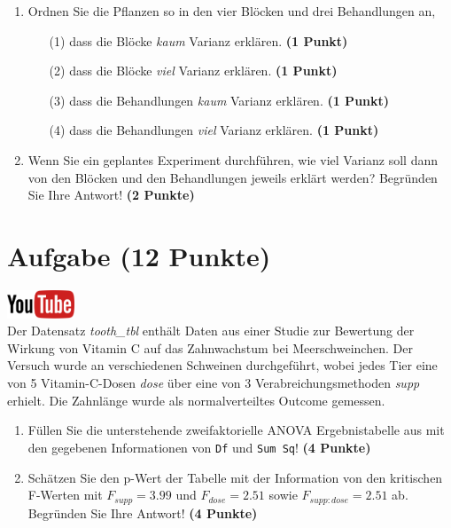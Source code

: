 \documentclass[a4paper, 10pt]{scrartcl}\usepackage[]{graphicx}\usepackage[]{xcolor}
\begin{document}
\begin{enumerate}
\item Ordnen Sie die Pflanzen so in den vier Bl{\"o}cken und drei Behandlungen an,
  \begin{enumerate}
  \item[(1)] dass die Bl{\"o}cke \textit{kaum} Varianz erkl{\"a}ren. \textbf{(1 Punkt)}
  \item[(2)] dass die Bl{\"o}cke \textit{viel} Varianz erkl{\"a}ren. \textbf{(1 Punkt)}  
  \item[(3)] dass die Behandlungen \textit{kaum} Varianz erkl{\"a}ren. \textbf{(1 Punkt)}
  \item[(4)] dass die Behandlungen \textit{viel} Varianz erkl{\"a}ren. \textbf{(1 Punkt)}
  \end{enumerate}
\item Wenn Sie ein geplantes Experiment durchf{\"u}hren, wie viel Varianz soll dann von
  den Bl{\"o}cken und den Behandlungen jeweils erkl{\"a}rt werden? Begr{\"u}nden Sie
  Ihre Antwort! \textbf{(2 Punkte)}
\end{enumerate}
 
\clearpage

\section{Aufgabe \hfill (12 Punkte)}

\hfill\href{https://youtu.be/8Pb2sKUIMyk}{\includegraphics[width =
  2cm]{img/youtube}}\\[1Ex]



Der Datensatz \textit{tooth\_tbl} enth{\"a}lt Daten aus einer Studie zur
Bewertung der Wirkung von Vitamin C auf das Zahnwachstum bei
Meerschweinchen. Der Versuch wurde an verschiedenen Schweinen durchgef{\"u}hrt,
wobei jedes Tier eine von 5 Vitamin-C-Dosen \textit{dose}
{\"u}ber eine von 3 Verabreichungsmethoden \textit{supp}
erhielt. Die Zahnl{\"a}nge wurde als normalverteiltes Outcome gemessen.



\begin{enumerate}
\item F{\"u}llen Sie die unterstehende zweifaktorielle ANOVA Ergebnistabelle aus
  mit den gegebenen Informationen von \texttt{Df} und \texttt{Sum Sq}!
  \textbf{(4 Punkte)}
\item Sch{\"a}tzen Sie den p-Wert der Tabelle mit der Information von den
  kritischen F-Werten mit
  $F_{supp} = 3.99$ und
  $F_{dose} = 2.51$ sowie
  $F_{supp:dose} = 2.51$ ab. Begr{\"u}nden Sie Ihre
  Antwort! \textbf{(4 Punkte)}
\end{enumerate}
\end{document}
